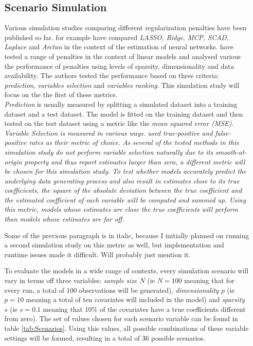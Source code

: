 \documentclass[12pt,a4paper]{article}
\newenvironment{lightbluebox}{%
    \begin{tcolorbox}[colback=lightblue, colframe=lightblue, fontupper=\itshape]%
}{%
    \end{tcolorbox}%
}
\begin{document}
\subsection{Scenario Simulation}
Various simulation studies comparing different regularization penalties have been published so far. \textcite{VettamJohn2022} for example have compared \textit{LASSO, Ridge, MCP, SCAD, Laplace} and \textit{Arctan} in the context of the estimation of neural networks. \textcite{WangEtAl2020} have tested a range of penalties in the context of linear models and analysed various the performance of penalties using levels of sparsity, dimensionality and data availability. The authors tested the performance based on three criteria: \textit{prediction}, \textit{variables selection} and \textit{variables ranking}. This simulation study will focus on the the first of these metrics.\\

\textit{Prediction} is usually measured by splitting a simulated dataset into a training dataset and a test dataset. The model is fitted on the training dataset and then tested on the test dataset using a metric like the \textit{mean squared error (MSE)}. \textit{\textit{Variable Selection} is measured in various ways. \textcite{WangEtAl2020} used \textit{true-positive} and \textit{false-positive} rates as their metric of choice. As several of the tested methods in this simulation study do not perform variable selection naturally due to its \textit{smooth-at-origin} property and thus report estimates larger than zero, a different metric will be chosen for this simulation study. To test whether models accurately predict the underlying data generating process and also result in estimates close to its true coefficients, the square of the absolute deviation between the true coefficient and the estimated coefficient of each variable will be computed and summed up. Using this metric, models whose estimates are close the true coefficients will perform than models whose estimates are far off.\\}
\begin{lightbluebox}
Some of the previous paragraph is in italic, because I initially planned on running a second simulation study on this metric as well, but implementation and runtime issues made it difficult. Will probably just mention it. 
\end{lightbluebox}

To evaluate the models in a wide range of contexts, every simulation scenario will vary in terms off three variables: \textit{sample size $N$} (ie $N=100$ meaning that for every run, a total of $100$ observations will be generated), \textit{dimensionality $p$} (ie $p=10$ meaning a total of ten covariates will included in the model) and \textit{sparsity $s$} (ie $s=0.1$ meaning that 10\% of the covariates have a true coefficients different from zero). The set of values chosen for each scenario variable can be found in table \ref{tab:Scenarios}. Using this values, all possible combinations of these variable settings will be formed, resulting in a total of $36$ possible scenarios. 
\end{document}
